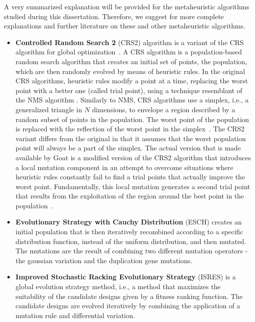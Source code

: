 A very summarized explanation will be provided for the metaheuristic algorithms studied during this dissertation. Therefore, we suggest \cite{BlumRoli2003Metaheuristics,Glover2003Metaheuristics} for more complete explanations and further literature on these and other metaheuristic algorithms.

\begin{itemize}
	\item \textbf{Controlled Random Search 2} (CRS2) algorithm is a variant of the CRS algorithm for global optimization~\cite{Price1983}. A CRS algorithm is a population-based random search algorithm that creates an initial set of points, the population, which are then randomly evolved by means of heuristic rules. In the original CRS algorithms, heuristic rules modify a point at a time, replacing the worst point with a better one (called trial point), using a technique resemblant of the NMS algorithm \cite{Nelder1964}. Similarly to NMS, CRS algorithms use a simplex, i.e., a generalized triangle in $N$ dimensions, to envelope a region described by a random subset of points in the population. The worst point of the population is replaced with the reflection of the worst point in the simplex~\cite{Kaelo2006CRS2}. The CRS2 variant differs from the original in that it assumes that the worst population point will always be a part of the simplex. The actual version that is made available by Goat is a modified version of the CRS2 algorithm that introduces a local mutation component in an attempt to overcome situations where heuristic rules constantly fail to find a trial points that actually improve the worst point. Fundamentally, this local mutation generates a second trial point that results from the exploitation of the region around the best point in the population~\cite{Kaelo2006CRS2}.  
	
	\item \textbf{Evolutionary Strategy with Cauchy Distribution} (ESCH)  creates an initial population that is then iteratively recombined according to a specific distribution function, instead of the uniform distribution, and then mutated. The mutations are the result of combining two different mutation operators - the gaussian variation and the duplication gene mutations.
	
	\item \textbf{Improved Stochastic Racking Evolutionary Strategy} (ISRES)  is a global evolution strategy method, i.e., a method that maximizes the suitability of the candidate designs given by a fitness ranking function. The candidate designs are evolved iteratively by combining the application of a mutation rule and differential variation.
	

\end{itemize}
